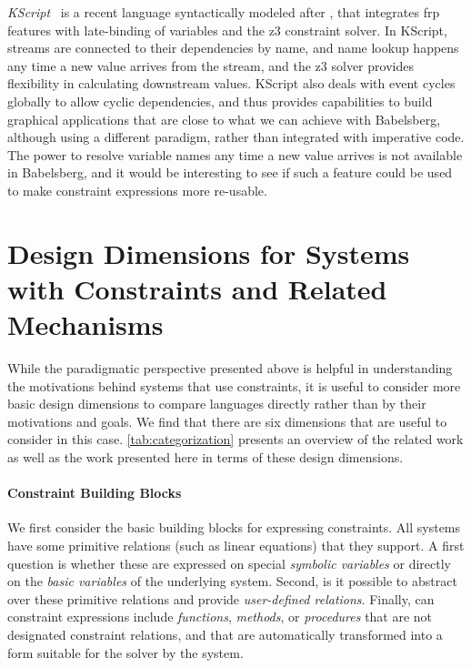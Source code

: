 \emph{KScript}~\cite{ohshima2013onward} is a recent language syntactically
modeled after \javascript, that integrates \ac{frp} features with late-binding
of variables and the \gls{z3} constraint solver. In KScript, streams are
connected to their dependencies by name, and name lookup happens any time a new
value arrives from the stream, and the \gls{z3} solver provides flexibility in
calculating downstream values. KScript also deals with event cycles globally to
allow cyclic dependencies, and thus provides capabilities to build graphical
applications that are close to what we can achieve with Babelsberg, although
using a different paradigm, rather than integrated with imperative code. The
power to resolve variable names any time a new value arrives is not available in
Babelsberg, and it would be interesting to see if such a feature could be used
to make constraint expressions more re-usable.

\section{Design Dimensions for Systems with Constraints and Related Mechanisms}

While the paradigmatic perspective presented above is helpful in understanding
the motivations behind systems that use constraints, it is useful to consider
more basic design dimensions to compare languages directly rather than by their
motivations and goals. We find that there are six dimensions that are useful
to consider in this case. \autoref{tab:categorization} presents an overview of
the related work as well as the work presented here in terms of these design
dimensions.

\paragraph*{Constraint Building Blocks}
We first consider the basic building blocks for expressing constraints. All
systems have some primitive relations (such as linear equations) that they
support. A first question is whether these are expressed on special
\emph{symbolic variables} or directly on the \emph{basic variables} of the
underlying system. Second, is it possible to abstract over these primitive
relations and provide \emph{user-defined relations}. Finally, can constraint
expressions include \emph{functions}, \emph{methods}, or \emph{procedures} that
are not designated constraint relations, and that are automatically transformed
into a form suitable for the solver by the system.
